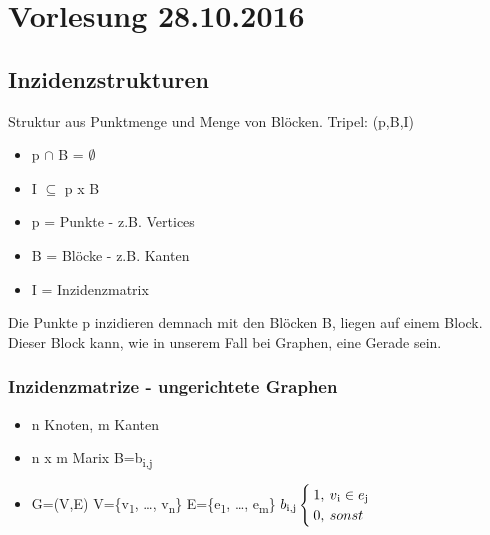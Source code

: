 \section{Vorlesung 28.10.2016}
\subsection{Inzidenzstrukturen}
Struktur aus Punktmenge und Menge von Blöcken.\newline\newline
Tripel: (p,B,I)
\begin{itemize}
	\item p $\cap$ B = $\emptyset$
	\item I $\subseteq$ p x B
	\item p = Punkte - z.B. Vertices
	\item B = Blöcke - z.B. Kanten
	\item I = Inzidenzmatrix
\end{itemize}
Die Punkte p \glqq inzidieren\grqq{} demnach mit den Blöcken B, \glqq liegen auf\grqq{} einem Block. Dieser Block kann, wie in unserem Fall bei Graphen, eine Gerade sein.\newline

\subsubsection{Inzidenzmatrize - ungerichtete Graphen}
\begin{itemize}
	\item n Knoten, m Kanten
	\item n x m Marix B=b\textsubscript{i,j}
	\item G=(V,E)
\hspace*{3mm}V=\{v\textsubscript{1}, \ldots, v\textsubscript{n}\}\newline
\hspace*{3mm}E=\{e\textsubscript{1}, \ldots, e\textsubscript{m}\}\newline
\hspace*{3mm}$b\textsubscript{i,j}\begin{cases}1,\>v\textsubscript{i}\in e\textsubscript{j}\\0,\>sonst\end{cases}$\newline
\end{itemize}

